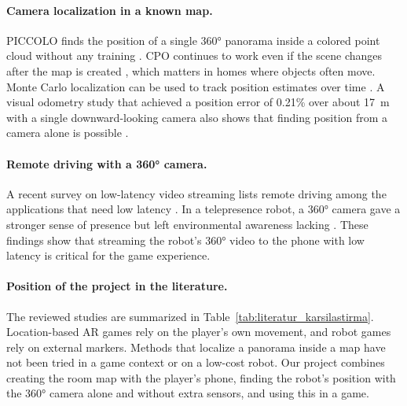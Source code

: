 \documentclass[11pt,a4paper]{article}
\begin{document}
\paragraph{Camera localization in a known map.}
PICCOLO finds the position of a single 360° panorama inside a colored point cloud without any training \cite{kim2021piccolo}. CPO continues to work even if the scene changes after the map is created \cite{kim2022cpo}, which matters in homes where objects often move. Monte Carlo localization can be used to track position estimates over time \cite{dellaert1999mcl}. A visual odometry study that achieved a position error of 0.21\% over about 17~m with a single downward-looking camera also shows that finding position from a camera alone is possible \cite{patruno2020visual}.

\paragraph{Remote driving with a 360° camera.}
A recent survey on low-latency video streaming lists remote driving among the applications that need low latency \cite{tang2026lowlatency}. In a telepresence robot, a 360° camera gave a stronger sense of presence but left environmental awareness lacking \cite{heshmat2018geocaching}. These findings show that streaming the robot's 360° video to the phone with low latency is critical for the game experience.

\paragraph{Position of the project in the literature.}
The reviewed studies are summarized in Table~\ref{tab:literatur_karsilastirma}. Location-based AR games rely on the player's own movement, and robot games rely on external markers. Methods that localize a panorama inside a map have not been tried in a game context or on a low-cost robot. Our project combines creating the room map with the player's phone, finding the robot's position with the 360° camera alone and without extra sensors, and using this in a game.
\end{document}
